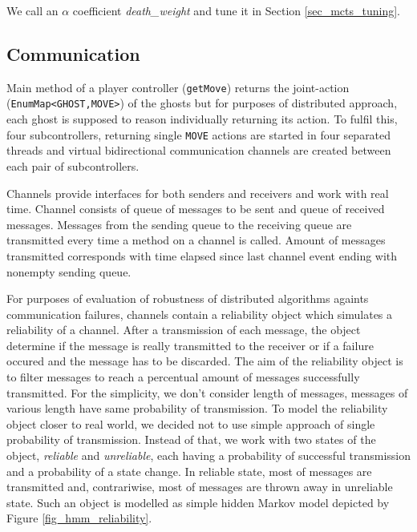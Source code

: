 We call an $\alpha$ coefficient \emph{death\_weight} and tune it in Section
\ref{sec_mcts_tuning}.


\subsection{Communication}

Main method of a player controller (\texttt{getMove}) returns the joint-action
(\texttt{EnumMap<GHOST,MOVE>}) of the ghosts
but for purposes of distributed approach, each ghost is supposed to reason individually 
returning its action. To fulfil this, four subcontrollers, returning single \texttt{MOVE}
actions are started in four separated threads and virtual bidirectional communication 
channels are created between each pair of subcontrollers.

Channels provide interfaces for both senders and receivers and work with real time. Channel
consists of queue of messages to be sent and queue of received messages. Messages from the
sending queue to the receiving queue are transmitted every time a method on a channel is
called. Amount of messages transmitted corresponds with time elapsed since last channel event
ending with nonempty sending queue.

For purposes of evaluation of robustness of distributed algorithms againts communication
failures, channels contain a reliability object which simulates a reliability of a channel.
After a transmission of each message, the object determine if the message is really transmitted
to the receiver or if a failure occured and the message has to be discarded. The aim of the
reliability object is to filter messages to reach a percentual amount of messages successfully
transmitted. For the simplicity, we don't consider length of messages, messages of various
length have same probability of transmission. To model the reliability object closer to real
world, we decided not to use simple approach of single probability of transmission. Instead of
that, we work with two states of the object, \emph{reliable} and \emph{unreliable}, each
having a probability of successful transmission and a probability of a state change. In
reliable state, most of messages are transmitted and, contrariwise, most of messages are thrown
away in unreliable state. Such an
object is modelled as simple hidden Markov model depicted by Figure \ref{fig_hmm_reliability}.

